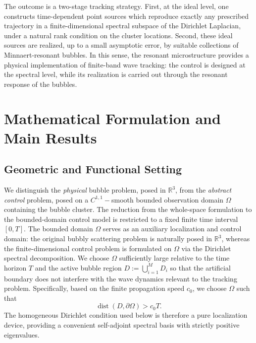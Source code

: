 \documentclass[11pt,a4paper]{article}
\numberwithin{equation}{section}
\newcommand{\R}{\mathbb{R}}
\DeclareMathOperator{\dist}{dist}
\begin{document}
\noindent 
The outcome is a two-stage tracking strategy. First, at the ideal level, one
constructs time-dependent point sources which reproduce exactly any prescribed trajectory in a finite-dimensional spectral subspace of the Dirichlet
Laplacian, under a natural rank condition on the cluster locations. Second, these ideal sources are realized, up to a small asymptotic error, by suitable
collections of Minnaert-resonant bubbles. In this sense, the resonant microstructure provides a physical implementation of finite-band wave tracking:
the control is designed at the spectral level, while its realization is carried out through the resonant response of the bubbles.










\section{Mathematical Formulation and Main Results}

\subsection{Geometric and Functional Setting}

\noindent
We distinguish the \emph{physical} bubble problem, posed in $\R^3$, from the \emph{abstract control} problem, posed on a $C^{1,1}-$smooth bounded observation domain $\Omega$ containing the bubble cluster.
\newline
The reduction from the whole-space formulation to the bounded-domain control model is restricted to a fixed finite time interval $[0,T]$. The bounded domain $\Omega$ serves as an auxiliary localization and control domain: the original bubbly scattering problem is naturally posed in $\mathbb R^3$, whereas the finite-dimensional control problem is formulated on $\Omega$ via the Dirichlet spectral decomposition. We choose $\Omega$ sufficiently large relative to the time horizon $T$ and the active bubble region $D := \bigcup_{i=1}^M D_i$ so that the artificial boundary does not interfere with the wave dynamics relevant to the tracking problem. Specifically, based on the finite propagation speed $c_0$, we choose $\Omega$ such that
\begin{equation}
\label{eq:finite-propagation-localization}
\dist(D,\partial\Omega)>c_0T .
\end{equation}
The homogeneous Dirichlet condition used below is therefore a pure localization device, providing a convenient self-adjoint spectral basis with strictly positive eigenvalues.
\newline
\end{document}
